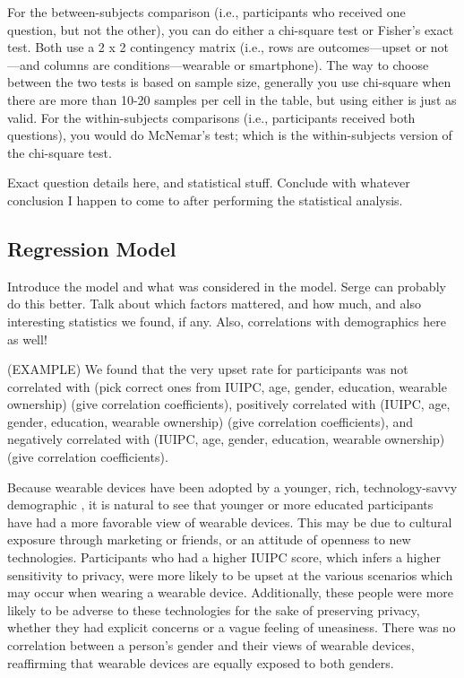 \documentclass{acm_proc_article-sp}
\begin{document}
For the between-subjects comparison (i.e., participants who received one question, but not the other), you can do either a chi-square test or Fisher's exact test. Both use a 2 x 2 contingency matrix (i.e., rows are outcomes---upset or not---and columns are conditions---wearable or smartphone). The way to choose between the two tests is based on sample size, generally you use chi-square when there are more than 10-20 samples per cell in the table, but using either is just as valid. For the within-subjects comparisons (i.e., participants received both questions), you would do McNemar's test; which is the within-subjects version of the chi-square test. 

Exact question details here, and statistical stuff. Conclude with whatever conclusion I happen to come to after performing the statistical analysis. 

\subsection{Regression Model} 
Introduce the model and what was considered in the model. Serge can probably do this better. Talk about which factors mattered, and how much, and also interesting statistics we found, if any. Also, correlations with demographics here as well! 

(EXAMPLE) We found that the very upset rate for participants was not correlated with (pick correct ones from IUIPC, age, gender, education, wearable ownership) (give correlation coefficients), positively correlated with  (IUIPC, age, gender, education, wearable ownership) (give correlation coefficients), and negatively correlated with  (IUIPC, age, gender, education, wearable ownership) (give correlation coefficients). 

Because wearable devices have been adopted by a younger, rich, technology-savvy demographic  \cite{cmo}, it is natural to see that younger or more educated participants have had a more favorable view of wearable devices. This may be due to cultural exposure through marketing or friends, or an attitude of openness to new technologies. Participants who had a higher IUIPC score, which infers a higher sensitivity to privacy, were more likely to be upset at the various scenarios which may occur when wearing a wearable device. Additionally, these people were more likely to be adverse to these technologies for the sake of preserving privacy, whether they had explicit concerns or a vague feeling of uneasiness. There was no correlation between a person's gender and their views of wearable devices, reaffirming that wearable devices are equally exposed to both genders. 
\end{document}
